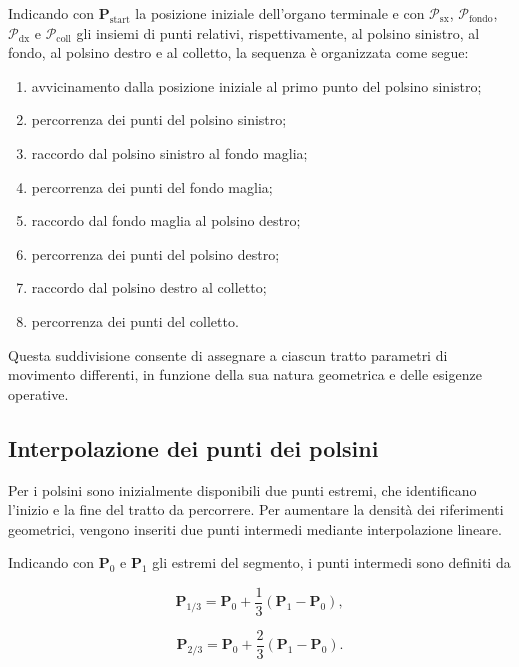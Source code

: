 Indicando con $\mathbf{P}_{\mathrm{start}}$ la posizione iniziale dell'organo terminale e con $\mathcal{P}_{\mathrm{sx}}$, $\mathcal{P}_{\mathrm{fondo}}$, $\mathcal{P}_{\mathrm{dx}}$ e $\mathcal{P}_{\mathrm{coll}}$ gli insiemi di punti relativi, rispettivamente, al polsino sinistro, al fondo, al polsino destro e al colletto, la sequenza è organizzata come segue:

\begin{enumerate}
    \item avvicinamento dalla posizione iniziale al primo punto del polsino sinistro;
    \item percorrenza dei punti del polsino sinistro;
    \item raccordo dal polsino sinistro al fondo maglia;
    \item percorrenza dei punti del fondo maglia;
    \item raccordo dal fondo maglia al polsino destro;
    \item percorrenza dei punti del polsino destro;
    \item raccordo dal polsino destro al colletto;
    \item percorrenza dei punti del colletto.
\end{enumerate}

Questa suddivisione consente di assegnare a ciascun tratto parametri di movimento differenti, in funzione della sua natura geometrica e delle esigenze operative.

\subsection{Interpolazione dei punti dei polsini}

Per i polsini sono inizialmente disponibili due punti estremi, che identificano l'inizio e la fine del tratto da percorrere. Per aumentare la densità dei riferimenti geometrici, vengono inseriti due punti intermedi mediante interpolazione lineare.

Indicando con $\mathbf{P}_0$ e $\mathbf{P}_1$ gli estremi del segmento, i punti intermedi sono definiti da

\begin{equation}
    \mathbf{P}_{1/3}
    = \mathbf{P}_0 + \frac{1}{3}
    \left(\mathbf{P}_1-\mathbf{P}_0\right),
\end{equation}

\begin{equation}
    \mathbf{P}_{2/3}
    = \mathbf{P}_0 + \frac{2}{3}
    \left(\mathbf{P}_1-\mathbf{P}_0\right).
\end{equation}

